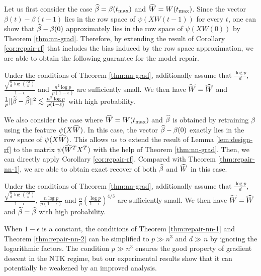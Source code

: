 Let us first consider the case $\widehat{\beta}=\beta(t_{\max})$ and $\widehat{W}=W(t_{\max})$. Since the vector $\beta(t)-\beta(t-1)$ lies in the row space of $\psi(XW(t-1))$ for every $t$, one can show that $\widehat{\beta}-\beta(0)$ approximately lies in the row space of $\psi(XW(0))$ by Theorem \ref{thm:nn-grad}. Therefore, by extending the result of Corollary \ref{cor:repair-rf} that includes the bias induced by the row space approximation, we are able to obtain the following guarantee for the model repair.
\begin{thm}\label{thm:repair-nn-1}
Under the conditions of Theorem \ref{thm:nn-grad}, additionally assume that $\frac{\log p}{d}$, $\frac{\sqrt{\frac{n}{d}\log\left(\frac{ed}{n}\right)}}{1-\epsilon}$ and $\frac{n^2\log p}{p(1-\epsilon)}$ are sufficiently small. We then have $\widetilde{W}=\widehat{W}$ and $\frac{1}{p}\|\widetilde{\beta}-\widehat{\beta}\|^2 \lesssim \frac{n^2\log p}{p(1-\varepsilon)}$ with high probability.
\end{thm}

We also consider the case where $\widehat{W}=W(t_{\max})$ and $\widehat{\beta}$ is obtained by retraining $\beta$ using the feature $\psi(X\widehat{W})$. In this case, the vector $\widehat{\beta}-\beta(0)$ exactly lies in the row space of $\psi(X\widehat{W})$. This allows us to extend the result of Lemma \ref{lem:design-rf} to the matrix $\psi(\widehat{W}^TX^T)$ with the help of Theorem \ref{thm:nn-grad}. Then, we can directly apply Corollary \ref{cor:repair-rf}. Compared with Theorem \ref{thm:repair-nn-1}, we are able to obtain exact recover of both $\widehat{\beta}$ and $\widehat{W}$ in this case.
\begin{thm}\label{thm:repair-nn-2}
Under the conditions of Theorem \ref{thm:nn-grad}, additionally assume that $\frac{\log p}{d}$, $\frac{\sqrt{\frac{n}{d}\log\left(\frac{ed}{n}\right)}}{1-\epsilon}$, $\frac{n\log p}{p(1-\epsilon)}$ and $\frac{n}{p}\left(\frac{\log p}{1-\epsilon}\right)^{4/3}$ are sufficiently small. We then have $\widetilde{W}=\widehat{W}$ and $\widetilde{\beta}=\widehat{\beta}$ with high probability.
\end{thm}

\begin{remark}
When $1-\epsilon$ is a constant, the conditions of Theorem \ref{thm:repair-nn-1} and Theorem \ref{thm:repair-nn-2} can be simplified to $p\gg n^3$ and $d\gg n$ by ignoring the logarithmic factors. The condition $p\gg n^3$ ensures the good property of gradient descent in the NTK regime, but our experimental results show that it can potentially be weakened by an improved analysis.
\end{remark}